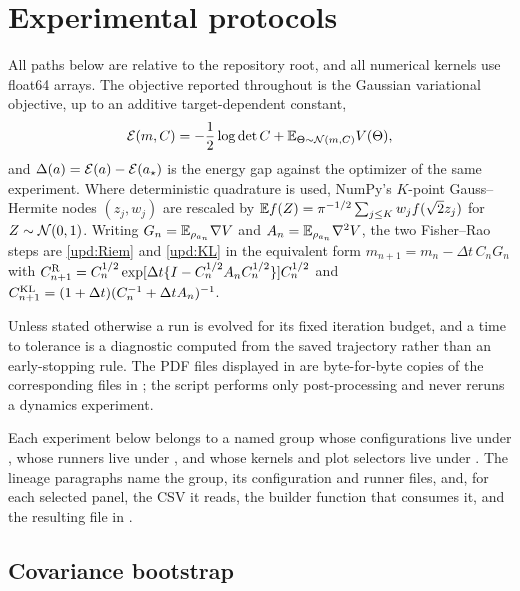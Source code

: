 \section{Experimental protocols}
\label{app:experiments}

All paths below are relative to the repository root, and all numerical kernels
use float64 arrays. The objective reported throughout is the Gaussian
variational objective, up to an additive target-dependent constant,
\begin{equation*}
  \mathcal{E}(m,C) = -\frac12\log\det C + \mathbb{E}_{\Theta\sim\mathcal{N}(m,C)}V(\Theta),
\end{equation*}
and $\Delta(a) = \mathcal{E}(a) - \mathcal{E}(a_\star)$ is the energy gap against the
optimizer of the same experiment. Where deterministic quadrature is used,
NumPy's $K$-point Gauss--Hermite nodes $(z_j,w_j)$ are rescaled by
$\mathbb{E} f(Z) = \pi^{-1/2}\sum_{j\leq K}w_jf(\sqrt2z_j)$ for $Z\sim\mathcal{N}(0,1)$. Writing
$G_n = \mathbb{E}_{\rho_{a_n}}\nabla V$ and $A_n = \mathbb{E}_{\rho_{a_n}}\nabla^2V$, the two
Fisher--Rao steps are \eqref{upd:Riem} and \eqref{upd:KL} in the equivalent
form $m_{n+1} = m_n - \Delta t\,C_nG_n$ with
$C_{n+1}^{\mathrm{R}} = C_n^{1/2}\exp[\Delta t\{I-C_n^{1/2}A_nC_n^{1/2}\}]C_n^{1/2}$
and $C_{n+1}^{\mathrm{KL}} = (1+\Delta t)(C_n^{-1}+\Delta tA_n)^{-1}$.

Unless stated otherwise a run is evolved for its fixed iteration budget, and a
time to tolerance is a diagnostic computed from the saved trajectory rather
than an early-stopping rule. The PDF files displayed in  are
byte-for-byte copies of the corresponding files in
; the script 
performs only post-processing and never reruns a dynamics experiment.

Each experiment below belongs to a named group whose configurations live under
, whose runners live under , and
whose kernels and plot selectors live under . The lineage
paragraphs name the group, its configuration and runner files, and, for each
selected panel, the CSV it reads, the builder function that consumes it, and
the resulting file in .

\subsection{Covariance bootstrap}

